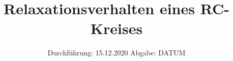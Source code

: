 

\usepackage{pdfpages} %

\subject{V353}
\title{Relaxationsverhalten eines RC-Kreises}
\date{%
  Durchführung: 15.12.2020
  \hspace{3em}
  Abgabe: DATUM
}



\maketitle
\thispagestyle{empty}
\tableofcontents
\newpage






\printbibliography{}




